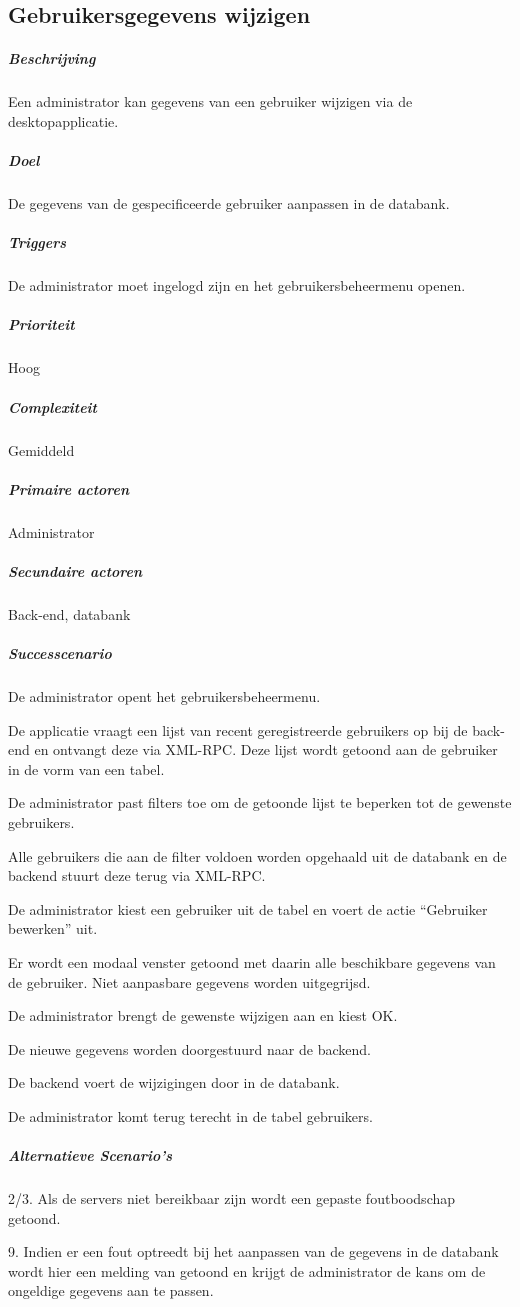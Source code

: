 \subsection{Gebruikersgegevens wijzigen}
\begin{compact}
\subparagraph{Beschrijving} Een administrator kan gegevens van een gebruiker wijzigen via de desktopapplicatie.
\subparagraph{Doel} De gegevens van de gespecificeerde gebruiker aanpassen in de databank.
\subparagraph{Triggers}De administrator moet ingelogd zijn en het gebruikersbeheermenu openen.
\subparagraph{Prioriteit}Hoog
\subparagraph{Complexiteit}Gemiddeld
\subparagraph{Primaire actoren}Administrator
\subparagraph{Secundaire actoren}Back-end, databank
\subparagraph{Successcenario}
\begin{enumerate_compact}
 \item De administrator opent het gebruikersbeheermenu.
 \item De applicatie vraagt een lijst van recent geregistreerde gebruikers op bij de back-end en ontvangt deze via XML-RPC. Deze lijst wordt getoond aan de gebruiker in de vorm van een tabel.
 \item De administrator past filters toe om de getoonde lijst te beperken tot de gewenste gebruikers.
 \item Alle gebruikers die aan de filter voldoen worden opgehaald uit de databank en de backend stuurt deze terug via XML-RPC.
 \item De administrator kiest een gebruiker uit de tabel en voert de actie ``Gebruiker bewerken'' uit.
 \item Er wordt een modaal venster getoond met daarin alle beschikbare gegevens van de gebruiker. Niet aanpasbare gegevens worden uitgegrijsd.
 \item De administrator brengt de gewenste wijzigen aan en kiest OK.
 \item De nieuwe gegevens worden doorgestuurd naar de backend.
 \item De backend voert de wijzigingen door in de databank.
 \item De administrator komt terug terecht in de tabel gebruikers.
\end{enumerate_compact}
\subparagraph{Alternatieve Scenario's}
\begin{enumerate_compact}
	\item[2/3.] Als de servers niet bereikbaar zijn wordt een gepaste foutboodschap getoond.
	\item[9.] Indien er een fout optreedt bij het aanpassen van de gegevens in de databank wordt hier een melding van getoond en krijgt de administrator de kans om de ongeldige gegevens aan te passen.
\end{enumerate_compact}
\end{compact}

